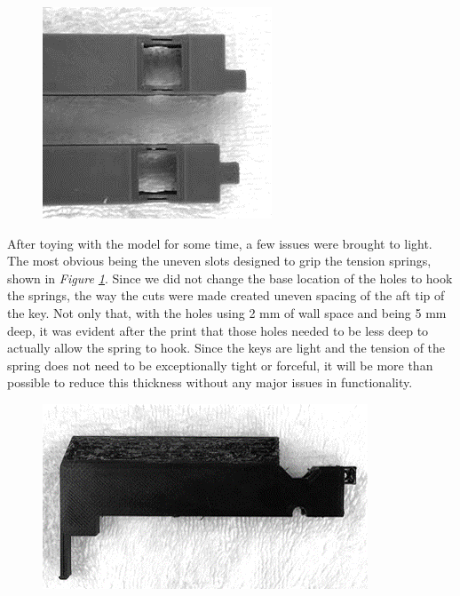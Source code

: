 \begin{figure}[h!]
  \centering
  \includegraphics[width=0.6\linewidth]{image/Print2.png}
  \caption{}
  \label{fig:print2}
\end{figure}

After toying with the model for some time, a few issues were brought to light. The most obvious being the uneven slots designed to grip the tension springs, shown in \textit{Figure \ref{fig:print2}}. Since we did not change the base location of the holes to hook the springs, the way the cuts were made created uneven spacing of the aft tip of the key. Not only that, with the holes using 2 mm of wall space and being 5 mm deep, it was evident after the print that those holes needed to be less deep to actually allow the spring to hook. Since the keys are light and the tension of the spring does not need to be exceptionally tight or forceful, it will be more than possible to reduce this thickness without any major issues in functionality.

\begin{figure}[h!]
  \centering
  \includegraphics[width=0.8\linewidth]{image/Print3.png}
  \caption{}
  \label{fig:print3}
\end{figure}

